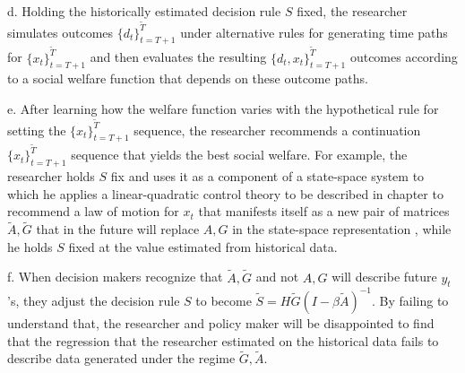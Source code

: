 \medskip

\item{d.} Holding the historically estimated decision rule $S $ fixed, the researcher simulates outcomes $\{d_t\}_{t=T+1}^{\tilde T}$
under alternative rules for generating
 time paths  for
 $\{x_t\}_{t=T+1}^{\tilde T}$ and then evaluates the
resulting $\{d_t, x_t\}_{t=T+1}^{\tilde T}$
outcomes according to a social  welfare function that depends on these outcome paths.   %


\medskip

\item{e.} After
learning how the  welfare function varies with the hypothetical rule for setting the $\{x_t\}_{t=T+1}^{\tilde T}$ sequence,
the researcher recommends  a continuation $\{x_t\}_{t=T+1}^{\tilde T}$
sequence that yields the best social welfare. For example, the researcher holds $S$ fix and uses it as a component
of a state-space system to which he applies a linear-quadratic control theory to be described in chapter  to  recommend a
law of motion for $x_t$ that manifests itself as a new pair of matrices $\tilde A, \tilde G$  that in the future
will replace $A, G$ in the state-space representation , while he holds $S$ fixed at the value estimated from historical data.

\medskip

\item{f.} When  decision makers recognize that $\tilde A, \tilde G$ and not $A, G$ will describe future $y_t$'s, they adjust the decision rule $S$  to become  $\tilde S = H \tilde G (I - \beta \tilde A)^{-1}$. By failing to understand that,
the researcher and policy maker will be disappointed to find that the regression  that the researcher  estimated on the historical data  fails to  describe data generated
under the regime $\tilde G, \tilde A$.

\medskip

